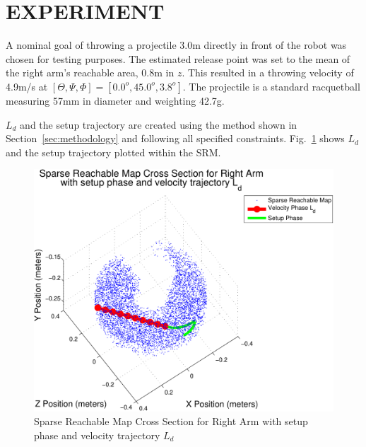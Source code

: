 \section{EXPERIMENT}\label{sec:exp}
A nominal goal of throwing a projectile 3.0m directly in front of the robot was chosen for testing purposes.  The estimated release point was set to the mean of the right arm's reachable area, 0.8m in $z$.  This resulted in a throwing velocity of 4.9m/s at $[\Theta, \Psi, \Phi] =[0.0^o,45.0^o, 3.8^o]$.  The projectile is a standard racquetball measuring 57mm in diameter and weighting 42.7g.

$L_d$ and the setup trajectory are created using the method shown in Section~\ref{sec:methodology} and following all specified constraints.  Fig.~\ref{fig:3dThrowPlot1} shows $L_d$ and the setup trajectory plotted within the SRM.

\begin{figure}[thpb]
  \centering
\includegraphics[width=1.0\columnwidth]{./MATLAB/throwTraj3D.pdf}
  \caption{Sparse Reachable Map Cross Section for Right Arm with setup phase and velocity trajectory $L_d$ }
  \label{fig:3dThrowPlot1}
\end{figure}


